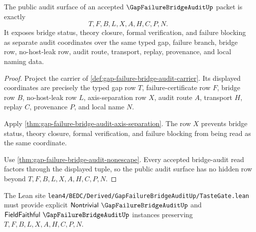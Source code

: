 \begin{theorem}
\label{thm:gap-failure-bridge-audit-public-surface}
The public audit surface of an accepted $\GapFailureBridgeAuditUp$ packet is exactly
$$
T,F,B,L,X,A,H,C,P,N.
$$
It exposes bridge status, theory closure, formal verification, and failure blocking as separate audit coordinates over the same typed gap, failure branch, bridge row, no-host-leak row, audit route, transport, replay, provenance, and local naming data.
\end{theorem}
\begin{proof}
Project the carrier of \autoref{def:gap-failure-bridge-audit-carrier}. Its displayed coordinates are precisely the typed gap row $T$, failure-certificate row $F$, bridge row $B$, no-host-leak row $L$, axis-separation row $X$, audit route $A$, transport $H$, replay $C$, provenance $P$, and local name $N$.

Apply \autoref{thm:gap-failure-bridge-audit-axis-separation}. The row $X$ prevents bridge status, theory closure, formal verification, and failure blocking from being read as the same coordinate.

Use \autoref{thm:gap-failure-bridge-audit-nonescape}. Every accepted bridge-audit read factors through the displayed tuple, so the public audit surface has no hidden row beyond $T,F,B,L,X,A,H,C,P,N$.
\end{proof}



The Lean site \texttt{lean4/BEDC/Derived/GapFailureBridgeAuditUp/TasteGate.lean} must provide explicit $\mathsf{Nontrivial}\ \GapFailureBridgeAuditUp$ and $\mathsf{FieldFaithful}\ \GapFailureBridgeAuditUp$ instances preserving $T,F,B,L,X,A,H,C,P,N$.


